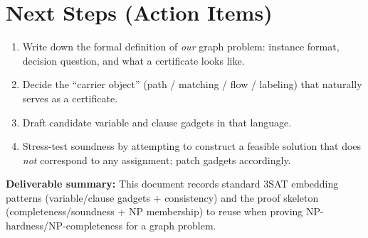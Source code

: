 \documentclass[11pt]{article}
\begin{document}
\section{Next Steps (Action Items)}
\begin{enumerate}[itemsep=2pt]
  \item Write down the formal definition of \emph{our} graph problem: instance format, decision question, and what a certificate looks like.
  \item Decide the ``carrier object'' (path / matching / flow / labeling) that naturally serves as a certificate.
  \item Draft candidate variable and clause gadgets in that language.
  \item Stress-test soundness by attempting to construct a feasible solution that does \emph{not} correspond to any assignment; patch gadgets accordingly.
\end{enumerate}

\vspace{8pt}
\noindent\textbf{Deliverable summary:} This document records standard 3SAT embedding patterns (variable/clause gadgets + consistency) and the proof skeleton (completeness/soundness + NP membership) to reuse when proving NP-hardness/NP-completeness for a graph problem.
\end{document}
